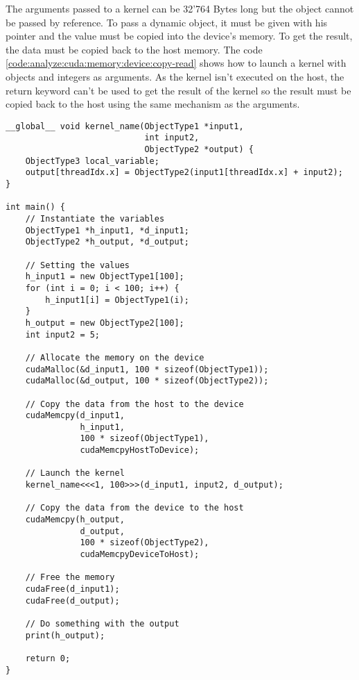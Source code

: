 The arguments passed to a kernel can be 32'764 Bytes long but the object cannot
be passed by reference.
To pass a dynamic object, it must be given with his pointer and the value must
be copied into the device's memory.
To get the result, the data must be copied back to the host memory.
The code \ref{code:analyze:cuda:memory:device:copy-read} shows how to launch a
kernel with objects and integers as arguments.
As the kernel isn't executed on the host, the return keyword can't be used to
get the result of the kernel so the result must be copied back to the host
using the same mechanism as the arguments.

\begin{code}
    \label{code:analyze:cuda:memory:device:copy-read}
    \begin{verbatim}
__global__ void kernel_name(ObjectType1 *input1,
                            int input2,
                            ObjectType2 *output) {
    ObjectType3 local_variable;
    output[threadIdx.x] = ObjectType2(input1[threadIdx.x] + input2);
}

int main() {
    // Instantiate the variables
    ObjectType1 *h_input1, *d_input1;
    ObjectType2 *h_output, *d_output;

    // Setting the values
    h_input1 = new ObjectType1[100];
    for (int i = 0; i < 100; i++) {
        h_input1[i] = ObjectType1(i);
    }
    h_output = new ObjectType2[100];
    int input2 = 5;

    // Allocate the memory on the device
    cudaMalloc(&d_input1, 100 * sizeof(ObjectType1));
    cudaMalloc(&d_output, 100 * sizeof(ObjectType2));

    // Copy the data from the host to the device
    cudaMemcpy(d_input1,
               h_input1,
               100 * sizeof(ObjectType1),
               cudaMemcpyHostToDevice);

    // Launch the kernel
    kernel_name<<<1, 100>>>(d_input1, input2, d_output);

    // Copy the data from the device to the host
    cudaMemcpy(h_output,
               d_output,
               100 * sizeof(ObjectType2),
               cudaMemcpyDeviceToHost);

    // Free the memory
    cudaFree(d_input1);
    cudaFree(d_output);

    // Do something with the output
    print(h_output);

    return 0;
}
    \end{verbatim}
\end{code}

